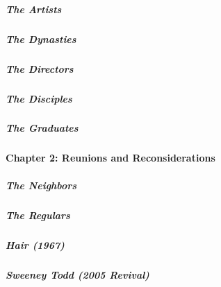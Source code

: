 \href{/interactive/2020/04/13/t-magazine/black-art-galleries.html}{}

\hypertarget{the-artists}{%
\subparagraph{The Artists}\label{the-artists}}

\href{/interactive/2020/04/13/t-magazine/italian-fashion-design-houses.html}{}

\hypertarget{the-dynasties}{%
\subparagraph{The Dynasties}\label{the-dynasties}}

\href{/interactive/2020/04/13/t-magazine/gordon-parks.html}{}

\hypertarget{the-directors}{%
\subparagraph{The Directors}\label{the-directors}}

\href{/interactive/2020/04/13/t-magazine/enrique-olvera-chef.html}{}

\hypertarget{the-disciples}{%
\subparagraph{The Disciples}\label{the-disciples}}

\href{/interactive/2020/04/13/t-magazine/royal-academy-antwerp.html}{}

\hypertarget{the-graduates}{%
\subparagraph{The Graduates}\label{the-graduates}}

\hypertarget{chapter-2-reunions-and-reconsiderations-1}{%
\paragraph{Chapter 2: Reunions and
Reconsiderations}\label{chapter-2-reunions-and-reconsiderations-1}}

\href{/interactive/2020/04/13/t-magazine/ninth-street-greenwich-village-neighbors.html}{}

\hypertarget{the-neighbors}{%
\subparagraph{The Neighbors}\label{the-neighbors}}

\href{/interactive/2020/04/13/t-magazine/omen-restaurant-nyc.html}{}

\hypertarget{the-regulars}{%
\subparagraph{The Regulars}\label{the-regulars}}

\href{/interactive/2020/04/13/t-magazine/hair-musical-broadway.html}{}

\hypertarget{hair-1967}{%
\subparagraph{Hair (1967)}\label{hair-1967}}

\href{/interactive/2020/04/13/t-magazine/sweeney-todd-revival.html}{}

\hypertarget{sweeney-todd-2005-revival}{%
\subparagraph{Sweeney Todd (2005
Revival)}\label{sweeney-todd-2005-revival}}

\href{/interactive/2020/04/13/t-magazine/daughters-of-the-dust.html}{}

